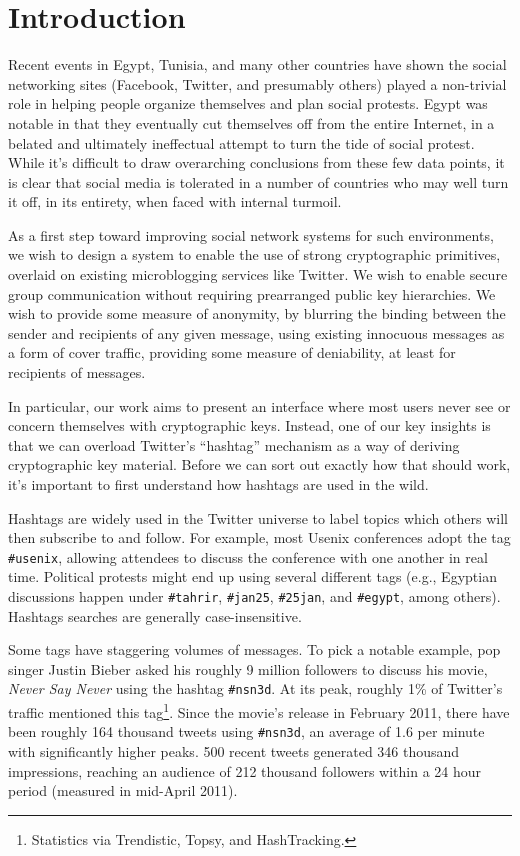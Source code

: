 \section{Introduction}

Recent events in Egypt, Tunisia, and many other countries have shown the social networking sites (Facebook, Twitter, and presumably others) played a non-trivial role in helping people organize themselves and plan social protests. Egypt was notable in that they eventually cut themselves off from the entire Internet, in a belated and ultimately ineffectual attempt to turn the tide of social protest. While it's difficult to draw overarching conclusions from these few data points, it is clear that social media is tolerated in a number of countries who may well turn it off, in its entirety, when faced with internal turmoil.

As a first step toward improving social network systems for such environments, we wish to design a system to enable the use of strong cryptographic primitives, overlaid on existing microblogging services like Twitter. We wish to enable secure group communication without requiring prearranged public key hierarchies. We wish to provide some measure of anonymity, by blurring the binding between the sender and recipients of any given message, using existing innocuous messages as a form of cover traffic, providing some measure of deniability, at least for recipients of messages.

In particular, our work aims to present an interface where most users never see or concern themselves with cryptographic keys. Instead, one of our key insights is that we can overload Twitter's ``hashtag'' mechanism as a way of deriving cryptographic key material. Before we can sort out exactly how that should work, it's important to first understand how hashtags are used in the wild.

Hashtags are widely used in the Twitter universe to label topics which others will then subscribe to and follow. For example, most Usenix conferences adopt the tag {\tt \#usenix}, allowing attendees to discuss the conference with one another in real time. Political protests might end up using several different tags (e.g., Egyptian discussions happen under {\tt \#tahrir}, {\tt \#jan25}, {\tt \#25jan}, and {\tt \#egypt}, among others). Hashtags searches are generally case-insensitive.

Some tags have staggering volumes of messages. To pick a notable example, pop singer Justin Bieber asked his roughly 9 million followers to discuss his movie, {\em Never Say Never} using the hashtag {\tt \#nsn3d}. At its peak, roughly 1\% of Twitter's traffic mentioned this tag\footnote{Statistics via Trendistic, Topsy, and HashTracking.}. Since the movie's release in February 2011, there have been roughly 164 thousand tweets using {\tt \#nsn3d}, an average of 1.6 per minute with significantly higher peaks. 500 recent tweets generated 346 thousand impressions, reaching an audience of 212 thousand followers within a 24 hour period (measured in mid-April 2011).

